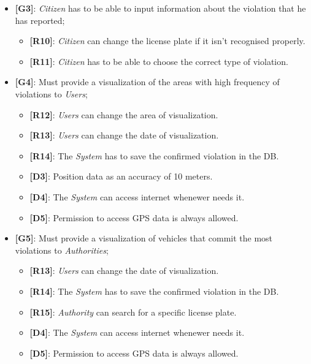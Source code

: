 \documentclass{article}
\begin{document}
\begin{itemize}
    \item \textbf{[G3]}: \textit{Citizen} has to be able to input information about the violation that he has reported;
    \begin{itemize}
        \item \textbf{[R10]}: \textit{Citizen} can change the license plate if it isn't recognised properly.
        \item \textbf{[R11]}: \textit{Citizen} has to be able to choose the correct type of violation.
    \end{itemize}

    \item \textbf{[G4]}: Must provide a visualization of the areas with high frequency of violations to \textit{Users};
    \begin{itemize}
        \item \textbf{[R12]}: \textit{Users} can change the area of visualization.
        \item \textbf{[R13]}: \textit{Users} can change the date of visualization. 
        \item \textbf{[R14]}: The \textit{System} has to save the confirmed violation in the DB.
        \item \textbf{[D3]}: Position data as an accuracy of 10 meters.
        \item \textbf{[D4]}: The \textit{System} can access internet whenewer needs it.
        \item \textbf{[D5]}: Permission to access GPS data is always allowed.
    \end{itemize}

    \item \textbf{[G5]}: Must provide a visualization of vehicles that commit the most violations to \textit{Authorities}; 
    \begin{itemize}
        \item \textbf{[R13]}: \textit{Users} can change the date of visualization.
        \item \textbf{[R14]}: The \textit{System} has to save the confirmed violation in the DB.
        \item \textbf{[R15]}: \textit{Authority} can search for a specific license plate.
        \item \textbf{[D4]}: The \textit{System} can access internet whenewer needs it.
        \item \textbf{[D5]}: Permission to access GPS data is always allowed.
    \end{itemize}


\end{itemize}
\end{document}
